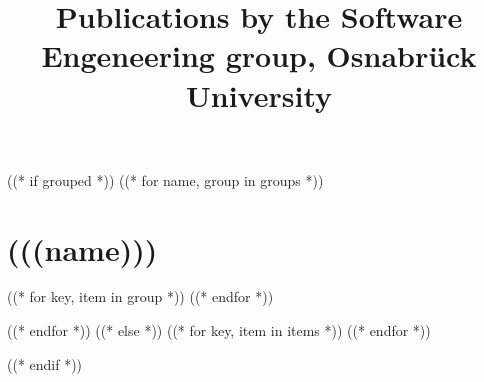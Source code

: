 \documentclass{scrartcl}
\title{Publications by the Software Engeneering group, Osnabrück University}
\begin{document}
((* if grouped *))
((* for name, group in groups *))
\section{(((name)))}
\begin{bibunit}[unsrt]
((* for key, item in group *))
\nocite{(((key)))}
((* endfor *))
\putbib[(((bibfile)))]
\end{bibunit}
((* endfor *))
((* else *))
((* for key, item in items *))
\nocite{(((key)))}
((* endfor *))


((* endif *))
\end{document}

